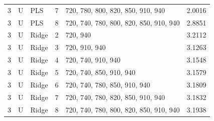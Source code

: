 \documentclass[10pt,a4paper]{article}
\begin{document}
\begin{longtable}{rllrlr}
3 & U & PLS & 7 & 720, 780, 800, 820, 850, 910, 940 & 2.0016 \\
3 & U & PLS & 8 & 720, 740, 780, 800, 820, 850, 910, 940 & 2.8851 \\
3 & U & Ridge & 2 & 720, 940 & 3.2112 \\
3 & U & Ridge & 3 & 720, 910, 940 & 3.1263 \\
3 & U & Ridge & 4 & 720, 740, 910, 940 & 3.1548 \\
3 & U & Ridge & 5 & 720, 740, 850, 910, 940 & 3.1579 \\
3 & U & Ridge & 6 & 720, 740, 780, 850, 910, 940 & 3.1809 \\
3 & U & Ridge & 7 & 720, 740, 780, 820, 850, 910, 940 & 3.1832 \\
3 & U & Ridge & 8 & 720, 740, 780, 800, 820, 850, 910, 940 & 3.1938 \\
\end{longtable}
\endgroup
\end{document}
